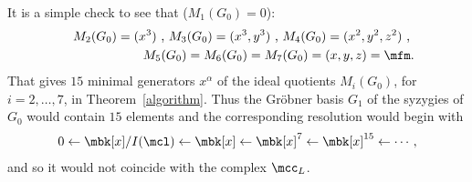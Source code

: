\begin{remark}
It is a simple check to see that ($M_1(G_0)=0$):
\begin{eqnarray*}
&&M_2(G_0)=(x^3)\mbox{ , }
M_3(G_0)=(x^3,y^3)\mbox{ , }
M_4(G_0)=(x^2,y^2,z^2)\mbox{ , }\\
&&M_5(G_0)=M_6(G_0)=M_7(G_0)=(x,y,z)=\mfm.
\end{eqnarray*}
That gives $15$ minimal generators $x^\alpha$ of the ideal quotients
$M_i(G_0)$, for $i=2,\ldots ,7$, in Theorem~\ref{algorithm}.  Thus the
Gr\"obner basis $G_1$ of the syzygies of $G_0$ would contain $15$
elements and the corresponding resolution would begin with
\begin{eqnarray*}
0\leftarrow \mbk[x]/I(\mcl)\leftarrow
\mbk[x]\leftarrow\mbk[x]^{7}\leftarrow \mbk[x]^{15}\leftarrow\cdots ,
\end{eqnarray*}
and so it would not coincide with the complex $\mcc_{L}$.
\end{remark}

